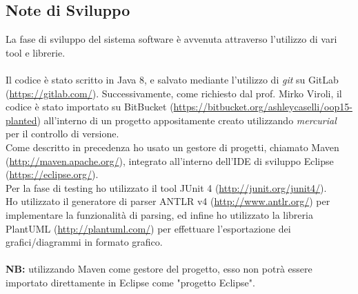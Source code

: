 \documentclass{article}
\begin{document}
  \subsection{Note di Sviluppo}
  La fase di sviluppo del sistema software è avvenuta attraverso l'utilizzo di vari tool e librerie.\\
  \\Il codice è stato scritto in Java 8, e salvato mediante l'utilizzo di \textit{git} su GitLab (\url{https://gitlab.com/}). Successivamente, come richiesto dal prof. Mirko Viroli,
  il codice è stato importato su BitBucket (\url{https://bitbucket.org/ashleycaselli/oop15-planted}) all'interno di un progetto appositamente creato
  utilizzando \textit{mercurial} per il controllo di versione.\\
  Come descritto in precedenza ho usato un gestore di progetti, chiamato Maven (\url{http://maven.apache.org/}), integrato all'interno dell'IDE di sviluppo Eclipse
  (\url{https://eclipse.org/}).\\Per la fase di testing ho utilizzato il tool JUnit 4 (\url{http://junit.org/junit4/}).\\
  Ho utilizzato il generatore di parser ANTLR v4 (\url{http://www.antlr.org/}) per implementare la funzionalità di parsing, ed infine ho utilizzato la libreria PlantUML (\url{http://plantuml.com/})
  per effettuare l'esportazione dei grafici/diagrammi in formato grafico.\\
  \\\textbf{NB:} utilizzando Maven come gestore del progetto, esso non potrà essere importato direttamente in Eclipse come "progetto Eclipse".
  \newpage
\end{document}
